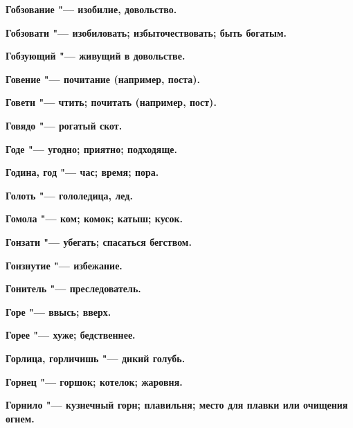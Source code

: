 \bfseries Гобзование \normalfont{} "--- изобилие, довольство. 




\bfseries Гобзовати \normalfont{} "--- изобиловать; избыточествовать; быть богатым. 




\bfseries Гобзующий \normalfont{} "--- живущий в довольстве. 




\bfseries Говение \normalfont{} "--- почитание (например, поста). 




\bfseries Говети \normalfont{} "--- чтить; почитать (например, пост). 




\bfseries Говядо \normalfont{} "--- рогатый скот. 




\bfseries Годе \normalfont{} "--- угодно; приятно; подходяще. 




\bfseries Година, год \normalfont{} "--- час; время; пора. 




\bfseries Голоть \normalfont{} "--- гололедица, лед. 




\bfseries Гомола \normalfont{} "--- ком; комок; катыш; кусок. 




\bfseries Гонзати \normalfont{} "--- убегать; спасаться бегством. 




\bfseries Гонзнутие \normalfont{} "--- избежание. 




\bfseries Гонитель \normalfont{} "--- преследователь. 




\bfseries Горе \normalfont{} "--- ввысь; вверх. 




\bfseries Горее \normalfont{} "--- хуже; бедственнее. 




\bfseries Горлица, горличишь \normalfont{} "--- дикий голубь. 




\bfseries Горнец \normalfont{} "--- горшок; котелок; жаровня. 




\bfseries Горнило \normalfont{} "--- кузнечный горн; плавильня; место для плавки или очищения огнем. 




